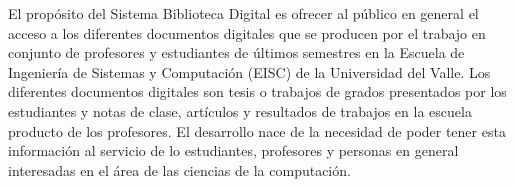 El propósito del Sistema Biblioteca Digital es ofrecer al público en general el acceso a los
diferentes documentos digitales que se producen por el trabajo en conjunto de profesores y
estudiantes de últimos semestres en la Escuela de Ingeniería de Sistemas y Computación (EISC) de la
Universidad del Valle.
Los diferentes documentos digitales son tesis o trabajos de grados presentados por los estudiantes
y notas de clase, artículos y resultados de trabajos en la escuela producto de los profesores.
El desarrollo nace de la necesidad de poder tener esta información al servicio de lo estudiantes,
profesores y personas en general interesadas en el área de las ciencias de la computación.
